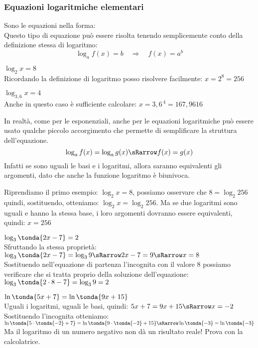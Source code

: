 \subsubsection{Equazioni logaritmiche elementari}
\label{subsubsec:esplog_eq_log_elementari}

\noindent Sono le equazioni nella forma: \quad {} 
\\[7pt]
Questo tipo di equazione può essere risolta tenendo semplicemente conto 
della definizione stessa di logaritmo:
\[\log_a{f(x)} = b \quad \Rightarrow \quad f(x)=a^b\]
\begin{esempio}
 \(\log_2{x} = 8\)\\[4pt] 
 Ricordando la definizione di logaritmo posso risolvere facilmente: \; \(x 
= 2^8 = 256\)
\end{esempio}
\begin{esempio}
 \(\log_{3,6}{x} = 4\)\\[4pt]
 Anche in questo caso è sufficiente calcolare: \quad \( x = 3,6^{\,4} = 
167,9616\)
\end{esempio}

In realtà, come per le esponenziali, anche per le equazioni logaritmiche 
può essere usato qualche piccolo
accorgimento che permette di semplificare la struttura dell'equazione.
\[\log_a{f(x)} = \log_a{g(x)} \sRarrow f(x) = g(x)\]
Infatti se sono uguali le basi e i logaritmi, allora saranno equivalenti 
gli argomenti, 
dato che anche la funzione logaritmo è biunivoca.

\begin{esempio}
 Riprendiamo il primo esempio: \(\log_2{x} = 8\), possiamo osservare che 
 \(8 = \log_2{256}\) quindi, sostituendo, 
 otteniamo: \(\log_2{x} = \log_2{256}\). Ma se due logaritmi sono uguali e 
hanno la stessa base, i loro argomenti dovranno essere equivalenti, quindi:
\(x = 256\)
\end{esempio}

\begin{esempio}
 \(\log_{3}\tonda{2x-7} = 2 \)\\[4pt]
 Sfruttando la stessa proprietà: 
 \(\log_{3}\tonda{2x-7} = \log_{3}9 \sRarrow  
2x -7 = 9 \sRarrow x = 8\)
\\[4pt] 
Sostituendo nell'equazione di partenza l'incognita con il valore 8 
possiamo verificare che si tratta proprio della soluzione dell'equazione:
\(\log_{3}\tonda{2 \cdot 8-7} = \log_{3} 9 = 2\)
\end{esempio}

\begin{esempio}
 \(\ln\tonda{5x +7} = \ln\tonda{9x +15}\)
 \\[4pt]
 Uguali i logaritmi, uguali le basi, quindi:
 \(5x +7 = 9x +15  \sRarrow x = -2\)
 \\[4pt]
Sostituendo l'incognita otteniamo:
 \(\ln\tonda{5 \cdot \tonda{-2} +7} = 
   \ln\tonda{9 \cdot \tonda{-2} +15} \sRarrow 
   \ln\tonda{-3} = \ln\tonda{-3}\)
   \\[4pt]
 Ma il logaritmo di un numero negativo non dà un risultato reale! Prova con 
la calcolatrice.
\end{esempio}

